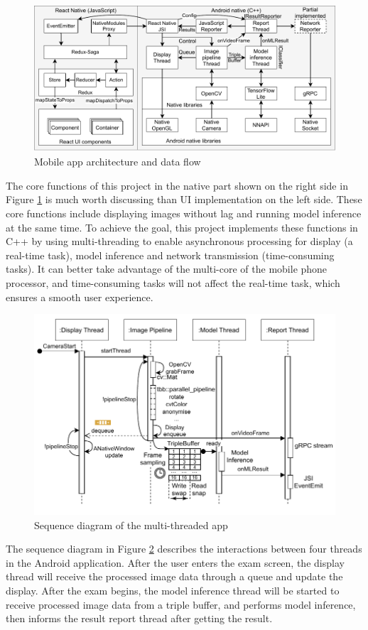 \begin{figure}[!ht]
    \centering
    \includegraphics[width=\textwidth]{implementation/imgs/4-mobile-arch.pdf}
    \caption{Mobile app architecture and data flow}
    \label{fig:4-mobile-arch}
\end{figure}

The core functions of this project in the native part shown on the right side in Figure \ref{fig:4-mobile-arch} is much worth discussing than UI implementation on the left side.
These core functions include displaying images without lag and running model inference at the same time.
To achieve the goal, this project implements these functions in C++ by using multi-threading to enable asynchronous processing for display (a real-time task), model inference and network transmission (time-consuming tasks).
It can better take advantage of the multi-core of the mobile phone processor, and time-consuming tasks will not affect the real-time task, which ensures a smooth user experience.

\begin{figure}[!ht]
    \centering
    \includegraphics[width=\textwidth]{implementation/imgs/4-model-infer.pdf}
    \caption{Sequence diagram of the multi-threaded app}
    \label{fig:4-model-infer}
\end{figure}
The sequence diagram in Figure \ref{fig:4-model-infer} describes the interactions between four threads in the Android application.
After the user enters the exam screen, the display thread will receive the processed image data through a queue and update the display.
After the exam begins, the model inference thread will be started to receive processed image data from a triple buffer, and performs model inference, then informs the result report thread after getting the result.

